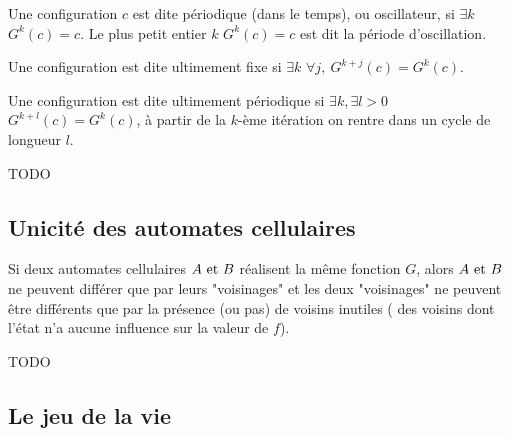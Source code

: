 \begin{definition}
	Une configuration $c$ est dite périodique (dans le temps), ou oscillateur, si $\exists k$ \tq $G^k(c) = c$. Le plus petit
	entier $k$ \tq $G^k(c) = c$ est dit la période d'oscillation.
\end{definition}

\begin{definition}
	Une configuration est dite ultimement fixe si $\exists k$ \tq $\forall j, \ G^{k+j}(c) =  G^{k}(c)$.
\end{definition}


\begin{definition}
	Une configuration est dite ultimement périodique si $\exists k, \exists l>0$ \tq $ G^{k+l}(c) =  G^{k}(c)$,
	\ie à partir de la $k$-ème itération on rentre dans un cycle de longueur $l$.
\end{definition}


\begin{exemple}
	TODO
\end{exemple}


\subsection{Unicité des automates cellulaires}


\begin{theorem}
	Si deux automates cellulaires $A \text{ et } B$ réalisent la même fonction $G$, alors $A \text{ et } B$ ne peuvent différer que par
	leurs "voisinages" et les deux "voisinages" ne peuvent être différents que par la présence (ou pas) de voisins inutiles (\cad
	des voisins dont l'état n'a aucune influence sur la valeur de $f$).
\end{theorem}


\begin{exemple}
	TODO
\end{exemple}

\subsection{Le jeu de la vie}

